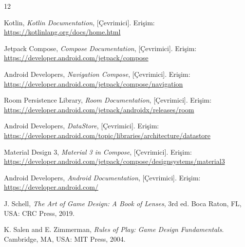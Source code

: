 \documentclass[conference]{IEEEtran}
\begin{document}
\begin{thebibliography}{12}

Kotlin, \emph{Kotlin Documentation}, [Çevrimici]. Erişim: \url{https://kotlinlang.org/docs/home.html}

Jetpack Compose, \emph{Compose Documentation}, [Çevrimici]. Erişim: \url{https://developer.android.com/jetpack/compose}

Android Developers, \emph{Navigation Compose}, [Çevrimici]. Erişim: \url{https://developer.android.com/jetpack/compose/navigation}

Room Persistence Library, \emph{Room Documentation}, [Çevrimici]. Erişim: \url{https://developer.android.com/jetpack/androidx/releases/room}

Android Developers, \emph{DataStore}, [Çevrimici]. Erişim: \url{https://developer.android.com/topic/libraries/architecture/datastore}

Material Design 3, \emph{Material 3 in Compose}, [Çevrimici]. Erişim: \url{https://developer.android.com/jetpack/compose/designsystems/material3}

Android Developers, \emph{Android Documentation}, [Çevrimici]. Erişim: \url{https://developer.android.com/}

J. Schell, \emph{The Art of Game Design: A Book of Lenses}, 3rd ed. Boca Raton, FL, USA: CRC Press, 2019.

K. Salen and E. Zimmerman, \emph{Rules of Play: Game Design Fundamentals}. Cambridge, MA, USA: MIT Press, 2004.

\end{thebibliography}
\end{document}
